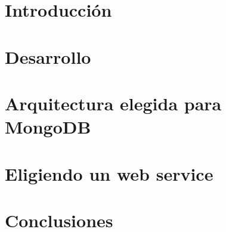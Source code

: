 \documentclass[11pt, a4paper]{article}
\begin{document}

\maketitle
\newpage
\tableofcontents
\newpage


\section{Introducción}

\section{Desarrollo}

\section{Arquitectura elegida para MongoDB}

\section{Eligiendo un web service}

\section{Conclusiones}

\end{document}
